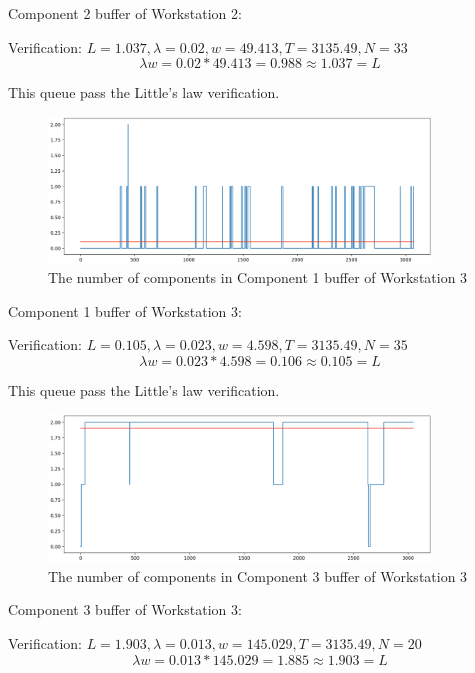 \documentclass{article}
\begin{document}
Component 2 buffer of Workstation 2:

Verification: $L = 1.037, \lambda = 0.02, w = 49.413, T = 3135.49, N = 33$
\begin{equation}
\lambda w = 0.02*49.413 = 0.988 \approx 1.037 = L
\end{equation}

This queue pass the Little's law verification.

\begin{figure}[htbp]
\begin{center}
\includegraphics[width=4in]{W3_C1B.png}
\caption{The number of components in Component 1 buffer of Workstation 3}
\label{W3_C1B}
\end{center}
\end{figure}

Component 1 buffer of Workstation 3:

Verification: $L = 0.105, \lambda = 0.023, w = 4.598, T = 3135.49, N = 35$
\begin{equation}
\lambda w = 0.023*4.598 = 0.106 \approx 0.105 = L
\end{equation}

This queue pass the Little's law verification.

\begin{figure}[htbp]
\begin{center}
\includegraphics[width=4in]{W3_C3B.png}
\caption{The number of components in Component 3 buffer of Workstation 3}
\label{W3_C3B}
\end{center}
\end{figure}

Component 3 buffer of Workstation 3:

Verification: $L = 1.903, \lambda = 0.013, w = 145.029, T = 3135.49, N = 20$
\begin{equation}
\lambda w = 0.013*145.029 = 1.885 \approx 1.903 = L
\end{equation}
\end{document}
